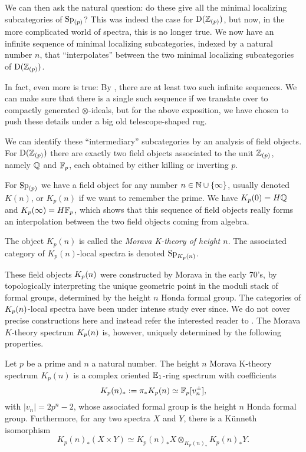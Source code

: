 We can then ask the natural question: do these give all the minimal localizing subcategories of $\mathrm{Sp}_{(p)}$? This was indeed the case for $\mathrm{D}(\mathbb{Z}_{(p)})$, but now, in the more complicated world of spectra, this is no longer true. We now have an infinite sequence of minimal localizing subcategories, indexed by a natural number $n$, that ``interpolates'' between the two minimal localizing subcategories of $\mathrm{D}(\mathbb{Z}_{(p)})$. 

\begin{remark}
    In fact, even more is true: By \cite{burklund-hahn-levy-schlank_23}, there are at least two such infinite sequences. We can make sure that there is a single such sequence if we translate over to compactly generated $\otimes$-ideals, but for the above exposition, we have chosen to push these details under a big old telescope-shaped rug.
\end{remark}

We can identify these ``intermediary'' subcategories by an analysis of field objects. For $\mathrm{D}(\mathbb{Z}_{(p)})$ there are exactly two field objects associated to the unit $\mathbb{Z}_{(p)}$, namely $\mathbb{Q}$ and $\mathbb{F}_p$, each obtained by either killing or inverting $p$. 

For $\mathrm{Sp}_{(p)}$ we have a field object for any number $n\in \mathbb{N}\cup \{\infty\}$, usually denoted $K(n)$, or $K_p(n)$ if we want to remember the prime. We have $K_p(0)=H\mathbb{Q}$ and $K_p(\infty) = H\mathbb{F}_p$, which shows that this sequence of field objects really forms an interpolation between the two field objects coming from algebra. 

\begin{notation}
    The object $K_p(n)$ is called the \emph{Morava K-theory of height $n$}. The associated category of $K_p(n)$-local spectra is denoted $\mathrm{Sp}_{{K_p(n)}}$. 
\end{notation}

These field objects ${K_p(n)}$ were constructed by Morava in the early 70's, by topologically interpreting the unique geometric point in the moduli stack of formal groups, determined by the height $n$ Honda formal group. The categories of ${K_p(n)}$-local spectra have been under intense study ever since. We do not cover precise constructions here and instead refer the interested reader to \cite{hovey-strickland_99}. The Morava $K$-theory spectrum ${K_p(n)}$ is, however, uniquely determined by the following properties. 

\begin{proposition}
    \label{ch0:prop:properties-of-K(n)}
    Let $p$ be a prime and $n$ a natural number. The height $n$ Morava K-theory spectrum $K_p(n)$ is a complex oriented $\mathbb{E}_1$-ring spectrum with coefficients 
    \[K_p(n)_*:=\pi_* K_p(n) \simeq \mathbb{F}_p[v_n^{\pm}],\]
    with $|v_n|=2p^n-2$, whose associated formal group is the height $n$ Honda formal group. Furthermore, for any two spectra $X$ and $Y$, there is a Künneth isomorphism 
    \[K_p(n)_*(X\times Y)\simeq K_p(n)_*X\otimes_{K_p(n)_*} K_p(n)_*Y.\]
\end{proposition}

